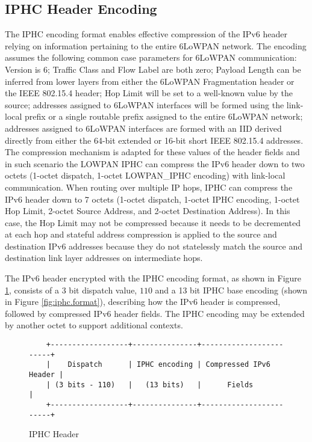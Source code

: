\documentclass[12pt, titlepage, a4paper]{report}
\newenvironment{mylisting}
{\begin{list}{}{\setlength{\leftmargin}{1em}}\item\footnotesize}
{\end{list}}
\begin{document}
\subsection{IPHC Header Encoding}
The IPHC encoding format enables effective compression of the IPv6 header relying on information pertaining to the entire 6LoWPAN network. The encoding assumes the following common case parameters for 6LoWPAN communication: Version is $6$; Traffic Class and Flow Label are both zero; Payload Length can be inferred from lower layers from either the 6LoWPAN Fragmentation header or the IEEE 802.15.4 header; Hop Limit will be set to a well-known value by the source; addresses assigned to 6LoWPAN interfaces will be formed using the link-local prefix or a single routable prefix assigned to the entire 6LoWPAN network; addresses assigned to 6LoWPAN interfaces are formed with an IID derived directly from either the 64-bit extended or 16-bit short IEEE 802.15.4 addresses. The compression mechanism is adapted for these values of the header fields and in such scenario the LOWPAN IPHC can compress the IPv6 header down to two octets (1-octet dispatch, 1-octet LOWPAN\_IPHC encoding) with link-local communication.  When routing over multiple IP hops, IPHC can compress the IPv6 header down to 7 octets (1-octet dispatch, 1-octet IPHC encoding, 1-octet Hop Limit, 2-octet Source Address, and 2-octet Destination Address).  In this case, the Hop Limit may not be compressed because it needs to be decremented at each hop and stateful address compression is applied to the source and destination IPv6 addresses because they do not statelessly match the source and destination link layer addresses on intermediate hops.

The IPv6 header encrypted with the IPHC encoding format, as shown in Figure \ref{fig:iphc.header}, consists of a 3 bit dispatch value, $110$ and a 13 bit IPHC base encoding (shown in Figure \ref{fig:iphc.format}), describing how the IPv6 header is compressed, followed by compressed IPv6 header fields. The IPHC encoding may be extended by another octet to support additional contexts.

\begin{figure}[htp]
\begin{mylisting}
\begin{verbatim}
    +------------------+---------------+------------------------+
    |    Dispatch      | IPHC encoding | Compressed IPv6 Header |
    | (3 bits - 110)   |   (13 bits)   |      Fields            |
    +------------------+---------------+------------------------+
\end{verbatim}
\end{mylisting}
\caption{IPHC Header}\label{fig:iphc.header}
\end{figure}
\end{document}
